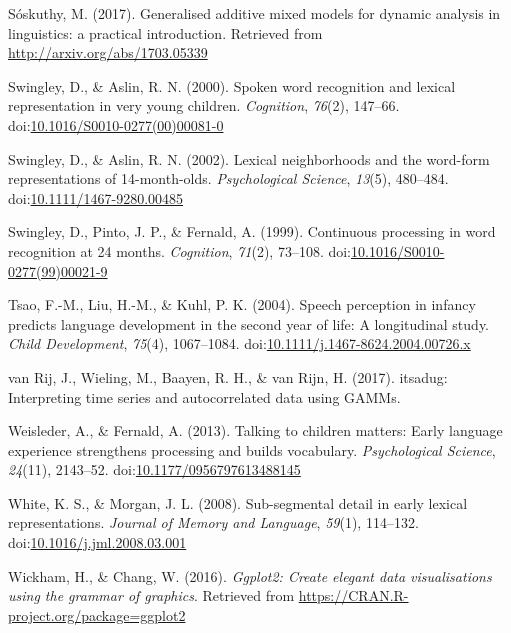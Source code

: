 \documentclass [11pt, proquest] {uwthesis}[2015/03/03]
\begin{document}
\hypertarget{ref-Soskuthy2017}{}
Sóskuthy, M. (2017). Generalised additive mixed models for dynamic
analysis in linguistics: a practical introduction. Retrieved from
\url{http://arxiv.org/abs/1703.05339}

\hypertarget{ref-Swingley2000}{}
Swingley, D., \& Aslin, R. N. (2000). Spoken word recognition and
lexical representation in very young children. \emph{Cognition},
\emph{76}(2), 147--66.
doi:\href{https://doi.org/10.1016/S0010-0277(00)00081-0}{10.1016/S0010-0277(00)00081-0}

\hypertarget{ref-Swingley2002}{}
Swingley, D., \& Aslin, R. N. (2002). Lexical neighborhoods and the
word-form representations of 14-month-olds. \emph{Psychological
Science}, \emph{13}(5), 480--484.
doi:\href{https://doi.org/10.1111/1467-9280.00485}{10.1111/1467-9280.00485}

\hypertarget{ref-Swingley1999}{}
Swingley, D., Pinto, J. P., \& Fernald, A. (1999). Continuous processing
in word recognition at 24 months. \emph{Cognition}, \emph{71}(2),
73--108.
doi:\href{https://doi.org/10.1016/S0010-0277(99)00021-9}{10.1016/S0010-0277(99)00021-9}

\hypertarget{ref-Tsao2004}{}
Tsao, F.-M., Liu, H.-M., \& Kuhl, P. K. (2004). Speech perception in
infancy predicts language development in the second year of life: A
longitudinal study. \emph{Child Development}, \emph{75}(4), 1067--1084.
doi:\href{https://doi.org/10.1111/j.1467-8624.2004.00726.x}{10.1111/j.1467-8624.2004.00726.x}

\hypertarget{ref-itsadug}{}
van Rij, J., Wieling, M., Baayen, R. H., \& van Rijn, H. (2017).
itsadug: Interpreting time series and autocorrelated data using GAMMs.

\hypertarget{ref-Weisleder2013}{}
Weisleder, A., \& Fernald, A. (2013). Talking to children matters: Early
language experience strengthens processing and builds vocabulary.
\emph{Psychological Science}, \emph{24}(11), 2143--52.
doi:\href{https://doi.org/10.1177/0956797613488145}{10.1177/0956797613488145}

\hypertarget{ref-WhiteMorgan2008}{}
White, K. S., \& Morgan, J. L. (2008). Sub-segmental detail in early
lexical representations. \emph{Journal of Memory and Language},
\emph{59}(1), 114--132.
doi:\href{https://doi.org/10.1016/j.jml.2008.03.001}{10.1016/j.jml.2008.03.001}

\hypertarget{ref-R-ggplot2}{}
Wickham, H., \& Chang, W. (2016). \emph{Ggplot2: Create elegant data
visualisations using the grammar of graphics}. Retrieved from
\url{https://CRAN.R-project.org/package=ggplot2}
\end{document}
